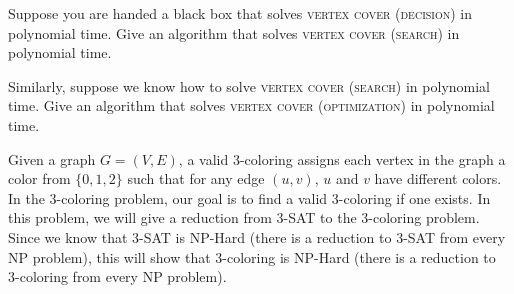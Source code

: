 	\begin{subparts}
		\subpart Suppose you are handed a black box that solves \textsc{vertex cover (decision)} in polynomial time. Give an algorithm that solves \textsc{vertex cover (search)} in polynomial time.

		\subpart Similarly, suppose we know how to solve \textsc{vertex cover (search)} in polynomial time. Give an algorithm that solves \textsc{vertex cover (optimization)} in polynomial time.

	\end{subparts}





Given a graph $G = (V, E)$, a valid 3-coloring assigns each vertex in the graph a color from $\{0, 1, 2\}$ such that for any edge $(u, v)$, $u$ and $v$ have different colors. In the 3-coloring problem, our goal is to find a valid 3-coloring if one exists. In this problem, we will give a reduction from 3-SAT to the 3-coloring problem. Since we know that 3-SAT is NP-Hard (there is a reduction to 3-SAT from every NP problem), this will show that 3-coloring is NP-Hard (there is a reduction to 3-coloring from every NP problem).


